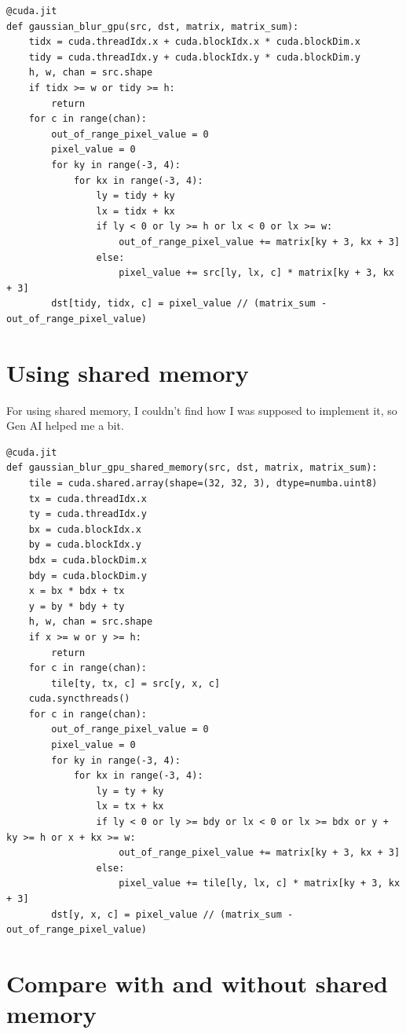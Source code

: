\documentclass{report}
\begin{document}
\begin{lstlisting}
@cuda.jit
def gaussian_blur_gpu(src, dst, matrix, matrix_sum):
    tidx = cuda.threadIdx.x + cuda.blockIdx.x * cuda.blockDim.x
    tidy = cuda.threadIdx.y + cuda.blockIdx.y * cuda.blockDim.y
    h, w, chan = src.shape
    if tidx >= w or tidy >= h:
        return
    for c in range(chan):
        out_of_range_pixel_value = 0
        pixel_value = 0
        for ky in range(-3, 4):
            for kx in range(-3, 4):
                ly = tidy + ky
                lx = tidx + kx
                if ly < 0 or ly >= h or lx < 0 or lx >= w:
                    out_of_range_pixel_value += matrix[ky + 3, kx + 3]
                else:
                    pixel_value += src[ly, lx, c] * matrix[ky + 3, kx + 3]
        dst[tidy, tidx, c] = pixel_value // (matrix_sum - out_of_range_pixel_value)
\end{lstlisting}

\section{Using shared memory}
For using shared memory, I couldn't find how I was supposed to implement it, so Gen AI helped me a bit.

\begin{lstlisting}
@cuda.jit
def gaussian_blur_gpu_shared_memory(src, dst, matrix, matrix_sum):
    tile = cuda.shared.array(shape=(32, 32, 3), dtype=numba.uint8)
    tx = cuda.threadIdx.x
    ty = cuda.threadIdx.y
    bx = cuda.blockIdx.x
    by = cuda.blockIdx.y
    bdx = cuda.blockDim.x
    bdy = cuda.blockDim.y
    x = bx * bdx + tx
    y = by * bdy + ty
    h, w, chan = src.shape
    if x >= w or y >= h:
        return
    for c in range(chan):
        tile[ty, tx, c] = src[y, x, c]
    cuda.syncthreads()
    for c in range(chan):
        out_of_range_pixel_value = 0
        pixel_value = 0
        for ky in range(-3, 4):
            for kx in range(-3, 4):
                ly = ty + ky
                lx = tx + kx
                if ly < 0 or ly >= bdy or lx < 0 or lx >= bdx or y + ky >= h or x + kx >= w:
                    out_of_range_pixel_value += matrix[ky + 3, kx + 3]
                else:
                    pixel_value += tile[ly, lx, c] * matrix[ky + 3, kx + 3]
        dst[y, x, c] = pixel_value // (matrix_sum - out_of_range_pixel_value)
\end{lstlisting}

\section{Compare with and without shared memory}
\end{document}

